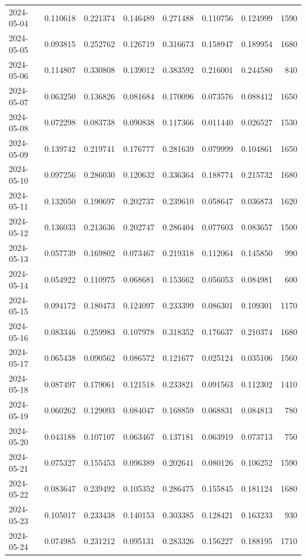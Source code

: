 \begin{tabular}{lrrrrrrr}
2024-05-04 & 0.110618 & 0.221374 & 0.146489 & 0.271488 & 0.110756 & 0.124999 & 1590 \\
2024-05-05 & 0.093815 & 0.252762 & 0.126719 & 0.316673 & 0.158947 & 0.189954 & 1680 \\
2024-05-06 & 0.114807 & 0.330808 & 0.139012 & 0.383592 & 0.216001 & 0.244580 & 840 \\
2024-05-07 & 0.063250 & 0.136826 & 0.081684 & 0.170096 & 0.073576 & 0.088412 & 1650 \\
2024-05-08 & 0.072298 & 0.083738 & 0.090838 & 0.117366 & 0.011440 & 0.026527 & 1530 \\
2024-05-09 & 0.139742 & 0.219741 & 0.176777 & 0.281639 & 0.079999 & 0.104861 & 1650 \\
2024-05-10 & 0.097256 & 0.286030 & 0.120632 & 0.336364 & 0.188774 & 0.215732 & 1680 \\
2024-05-11 & 0.132050 & 0.190697 & 0.202737 & 0.239610 & 0.058647 & 0.036873 & 1620 \\
2024-05-12 & 0.136033 & 0.213636 & 0.202747 & 0.286404 & 0.077603 & 0.083657 & 1500 \\
2024-05-13 & 0.057739 & 0.169802 & 0.073467 & 0.219318 & 0.112064 & 0.145850 & 990 \\
2024-05-14 & 0.054922 & 0.110975 & 0.068681 & 0.153662 & 0.056053 & 0.084981 & 600 \\
2024-05-15 & 0.094172 & 0.180473 & 0.124097 & 0.233399 & 0.086301 & 0.109301 & 1170 \\
2024-05-16 & 0.083346 & 0.259983 & 0.107978 & 0.318352 & 0.176637 & 0.210374 & 1680 \\
2024-05-17 & 0.065438 & 0.090562 & 0.086572 & 0.121677 & 0.025124 & 0.035106 & 1560 \\
2024-05-18 & 0.087497 & 0.179061 & 0.121518 & 0.233821 & 0.091563 & 0.112302 & 1410 \\
2024-05-19 & 0.060262 & 0.129093 & 0.084047 & 0.168859 & 0.068831 & 0.084813 & 780 \\
2024-05-20 & 0.043188 & 0.107107 & 0.063467 & 0.137181 & 0.063919 & 0.073713 & 750 \\
2024-05-21 & 0.075327 & 0.155453 & 0.096389 & 0.202641 & 0.080126 & 0.106252 & 1590 \\
2024-05-22 & 0.083647 & 0.239492 & 0.105352 & 0.286475 & 0.155845 & 0.181124 & 1680 \\
2024-05-23 & 0.105017 & 0.233438 & 0.140153 & 0.303385 & 0.128421 & 0.163233 & 930 \\
2024-05-24 & 0.074985 & 0.231212 & 0.095131 & 0.283326 & 0.156227 & 0.188195 & 1710 \\

\end{tabular}
